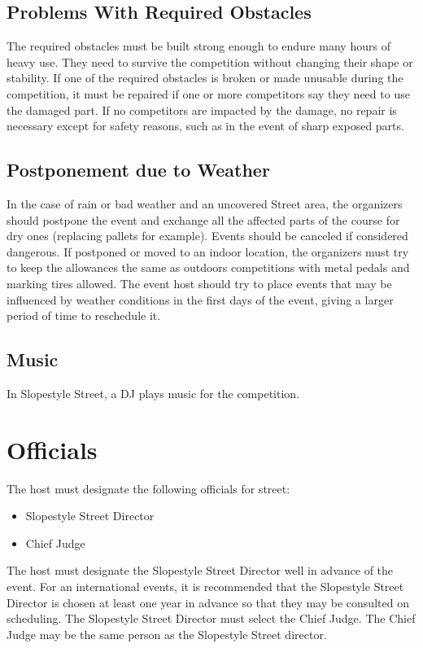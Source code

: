 \subsection{Problems With Required Obstacles}
The required obstacles must be built strong enough to endure many hours of heavy use.
They need to survive the competition without changing their shape or stability.
If one of the required obstacles is broken or made unusable during the competition, it must be repaired if one or more competitors say they need to use the damaged part.
If no competitors are impacted by the damage, no repair is necessary except for safety reasons, such as in the event of sharp exposed parts.

\subsection{Postponement due to Weather}

In the case of rain or bad weather and an uncovered Street area, the organizers should postpone the event and exchange all the affected parts of the course for dry ones (replacing pallets for example).
Events should be canceled if considered dangerous.
If postponed or moved to an indoor location, the organizers must try to keep the allowances the same as outdoors competitions with metal pedals and marking tires allowed.
The event host should try to place events that may be influenced by weather conditions in the first days of the event, giving a larger period of time to reschedule it.

\subsection{Music}
In Slopestyle Street, a DJ plays music for the competition.

\section{Officials}

The host must designate the following officials for street:
\begin{itemize}
\item Slopestyle Street Director
\item Chief Judge
\end{itemize}

The host must designate the Slopestyle Street Director well in advance of the event.
For an international events, it is recommended that the Slopestyle Street Director is chosen at least one year in advance so that they may be consulted on scheduling.
The Slopestyle Street Director must select the Chief Judge.
The Chief Judge may be the same person as the Slopestyle Street director.

